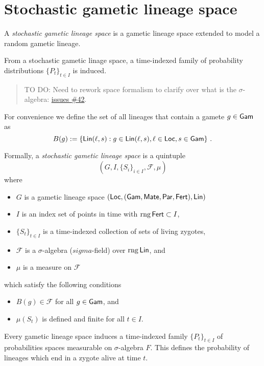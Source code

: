 \documentclass{article}
\begin{document}
\section{Stochastic gametic lineage space}

A \emph{stochastic gametic lineage space} is a gametic lineage space
extended to model a random gametic lineage.

From a stochastic gametic linage space, a time-indexed family of
probability distributions \(\{ P_t \}_{t \in I}\) is induced.

\begin{quote}
TO DO: Need to rework space formalism to clarify over what is the
\(\sigma\)-algebra:
\href{https://gitlab.com/castedo/study-docs/-/issues/42}{issues \#42}.
\end{quote}

For convenience we define the set of all lineages that contain a gamete
\(g \in \mathsf{Gam}\) as \[
B(g) := \{ \mathsf{Lin}(\ell, s) : g \in \mathsf{Lin}(\ell,s), \ell \in \mathsf{Loc}, s \in \mathsf{Gam} \}
\text{ .}
\]

Formally, a \emph{stochastic gametic lineage space} is a quintuple \[
(G, I, \{ S_i \}_{i \in I}, \mathcal{F}, \mu)
\] where

\begin{itemize}
\item
  \(G\) is a gametic lineage space
  \((\mathsf{Loc}, (\mathsf{Gam}, \mathsf{Mate}, \mathsf{Par}, \mathsf{Fert}), \mathsf{Lin})\)
\item
  \(I\) is an index set of points in time with \(\operatorname{rng} \mathsf{Fert} \subset I\),
\item
  \(\{S_t\}_{t \in I}\) is a time-indexed collection of sets of living
  zygotes,
\item
  \(\mathcal{F}\) is a \(\sigma\)-algebra (\(sigma\)-field) over
  \(\operatorname{rng} \mathsf{Lin}\), and
\item
  \(\mu\) is a measure on \(\mathcal{F}\)
\end{itemize}

which satisfy the following conditions

\begin{itemize}
\item
  \(B(g) \in \mathcal{F}\) for all \(g \in \mathsf{Gam}\), and
\item
  \(\mu(S_t)\) is defined and finite for all \(t \in I\).
\end{itemize}

Every gametic lineage space induces a time-indexed family
\(\{P_t\}_{t \in I}\) of probabilities spaces measurable on
\(\sigma\)-algebra \(F\). This defines the probability of lineages which
end in a zygote alive at time \(t\).
\end{document}
